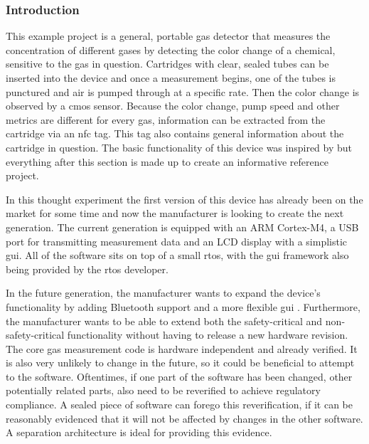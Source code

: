 \subsubsection{Introduction}
This example project is a general, portable gas detector that measures the concentration of different gases by detecting the color change of a chemical, sensitive to the gas in question. Cartridges with clear, sealed tubes can be inserted into the device and once a measurement begins, one of the tubes is punctured and air is pumped through at a specific rate. Then the color change is observed by a \acrshort{cmos} sensor. Because the color change, pump speed and other metrics are different for every gas, information can be extracted from the cartridge via an \acrshort{nfc} tag. This tag also contains general information about the cartridge in question. The basic functionality of this device was inspired by \cite{gasdetect} but everything after this section is made up to create an informative reference project.

In this thought experiment the first version of this device has already been on the market for some time and now the manufacturer is looking to create the next generation. The current generation is equipped with an ARM Cortex-M4, a USB port for transmitting measurement data and an LCD display with a simplistic \acrshort{gui}. All of the software sits on top of a small \acrshort{rtos}, with the \acrshort{gui} framework also being provided by the \acrshort{rtos} developer.

In the future generation, the manufacturer wants to expand the device's functionality by adding Bluetooth support and a more flexible \acrshort{gui} . Furthermore, the manufacturer wants to be able to extend both the safety-critical and non-safety-critical functionality without having to release a new hardware revision. The core gas measurement code is hardware independent and already verified. It is also very unlikely to change in the future, so it could be beneficial to attempt to  the software. Oftentimes, if one part of the software has been changed, other potentially related parts, also need to be reverified to achieve regulatory compliance. A sealed piece of software can forego this reverification, if it can be reasonably evidenced that it will not be affected by changes in the other software. A separation architecture is ideal for providing this evidence.
